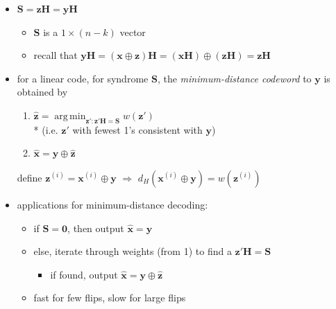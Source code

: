 \documentclass[10pt, landscape]{article}
\DeclareMathOperator*{\argmin}{arg\,min}
\begin{document}
\begin{multicols*}{4}
  \begin{itemize}
    \item {} $\mathbf{S} = \mathbf{zH} = \mathbf{yH}$
      \begin{itemize}
        \item $\mathbf{S}$ is a $1 \times (n-k)$ vector
        \item recall that $\mathbf{yH} = (\mathbf{x} \oplus \mathbf{z}) \mathbf{H} = (\mathbf{xH}) \oplus (\mathbf{zH}) = \mathbf{zH}$
      \end{itemize}
    \item for a linear code, for syndrome $\mathbf{S}$, the \textit{minimum-distance codeword} to $\mathbf{y}$ is obtained by
      \begin{enumerate}
        \item \( {\displaystyle{ \hat{\mathbf{z}} = \argmin_{\mathbf{z'} : \mathbf{z'H=S}} w(\mathbf{z'}) }} \)  
          \\* (i.e. $\mathbf{z}'$ with fewest 1's consistent with $\mathbf{y}$)
        \item $\hat{\mathbf{x}} = \mathbf{y} \oplus \hat{\mathbf{z}}$
      \end{enumerate}
      \begin{niceproof}
        define $\mathbf{z}^{(i)} = \mathbf{x}^{(i)}\oplus \mathbf{y}$ $\Rightarrow$ $d_H (\mathbf{x}^{(i)} \oplus \mathbf{y}) = w(\mathbf{z}^{(i)})$
      \end{niceproof}
    \item applications for minimum-distance decoding:
      \begin{itemize}
        \item if $\mathbf{S=0}$, then output $\hat{\mathbf{x}} = \mathbf{y}$
        \item else, iterate through weights (from 1) to find a $\mathbf{z'H=S}$
          \begin{itemize}
            \item if found, output $\hat{\mathbf{x}} = \mathbf{y} \oplus \hat{\mathbf{z}}$
          \end{itemize}
        \item fast for few flips, slow for large flips
      \end{itemize}
  \end{itemize}




\end{multicols*}
\end{document}
